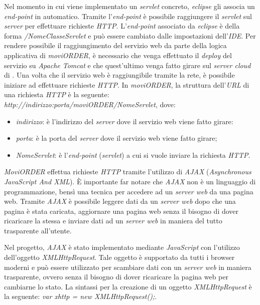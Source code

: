 Nel momento in cui viene implementato un \textit{servlet} concreto, \textit{eclipse} gli associa un \textit{end-point} in automatico. Tramite l'\textit{end-point} è possibile raggiungere il \textit{servlet} sul \textit{server} per effettuare richieste \textit{HTTP}. L'\textit{end-point} associato da \textit{eclipse} è della forma \textit{/NomeClasseServlet} e può essere cambiato dalle impostazioni dell'\textit{IDE}. Per rendere possibile il raggiungimento del servizio web da parte della logica applicativa di \textit{moviORDER}, è necessario che venga effettuato il \textit{deploy} del servizio su \textit{Apache Tomcat} e che quest'ultimo venga fatto girare sul \textit{server cloud} di \visione{}. Una volta che il servizio web è raggiungibile tramite la rete, è possibile iniziare ad effettuare richieste \textit{HTTP}. In \textit{moviORDER}, la struttura dell'\textit{URL} di una richiesta \textit{HTTP} è la seguente: \textit{http://indirizzo:porta/moviORDER/NomeServlet}, dove:
\begin{itemize}
	\item \textit{indirizzo}: è l'indirizzo del \textit{server} dove il servizio web viene fatto girare:
	\item \textit{porta}: è la porta del \textit{server} dove il servizio web viene fatto girare;
	\item \textit{NomeServlet}: è l'\textit{end-point} (\textit{servlet}) a cui si vuole inviare la richiesta \textit{HTTP}.
\end{itemize}

\textit{MoviORDER} effettua richieste \textit{HTTP} tramite l'utilizzo di \textit{AJAX} (\textit{Asynchronous JavaScript And XML}). È importante far notare che \textit{AJAX} non è un linguaggio di programmazione, bensì una tecnica per accedere ad un \textit{server web} da una pagina web. Tramite \textit{AJAX} è possibile leggere dati da un \textit{server web} dopo che una pagina è stata caricata, aggiornare una pagina web senza il bisogno di dover ricaricare la stessa e inviare dati ad un \textit{server web} in maniera del tutto trasparente all'utente. 

Nel progetto, \textit{AJAX} è stato implementato mediante \textit{JavaScript} con l'utilizzo dell'oggetto \textit{XMLHttpRequest}. Tale oggetto è supportato da tutti i browser moderni e può essere utilizzato per scambiare dati con un \textit{server web} in maniera trasparente, ovvero senza il bisogno di dover ricaricare la pagina web per cambiarne lo stato. La sintassi per la creazione di un oggetto \textit{XMLHttpRequest} è la seguente:
\textit{var xhttp = new XMLHttpRequest();}. 

